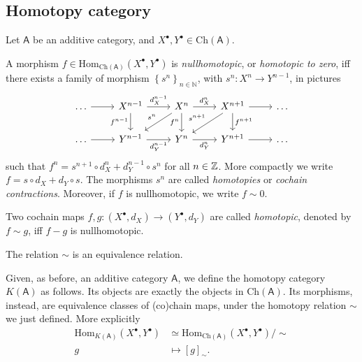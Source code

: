 \subsection{Homotopy category}
Let $\mathsf{A}$ be an additive category, and $X^{\bullet}, Y^{\bullet} \in \mathrm{Ch}(\mathsf{A})$.

\begin{defn}
	A morphism $f \in \mathrm{Hom}_{\mathrm{Ch}(\mathsf{A})} \left( X^{\bullet}, Y^{\bullet} \right)$ is
	{\em nullhomotopic}, or {\em homotopic to zero}, iff there exists
	a family of morphism $\left\{ s^n \right\}_{n \in \mathbb{N}}$, with
	$s^n\colon X^n \to Y^{n-1}$, in pictures
	\begin{equation}
	\begin{tikzcd}
		\ldots \arrow[r, "", rightarrow] &
		X^{n-1} \arrow[r, "d_X^{n-1}", rightarrow] \arrow[d, "f^{n-1}"', rightarrow] &
		X^n \arrow[r, "d^n_X", rightarrow] \arrow[d, "f^n"', rightarrow] \arrow[ld, "s^n"', rightarrow] &
		X^{n+1} \arrow[r, "", rightarrow] \arrow[d, "f^{n+1}", rightarrow] \arrow[dl, "s^{n+1}"', rightarrow] &
		\ldots \\
		\ldots \arrow[r, "", rightarrow] &
		Y^{n-1} \arrow[r, "d_Y^{n-1}"', rightarrow] &
		Y^n \arrow[r, "d^n_Y"', rightarrow] &
		Y^{n+1} \arrow[r, "", rightarrow] &
		\ldots
	\end{tikzcd}
	\end{equation}
	such that $f^n = s^{n+1} \circ d_X^{n} + d_Y^{n-1} \circ s^n$ for all $n \in \mathbb{Z}$.
	More compactly we write $f = s \circ d_X + d_Y \circ s$.
	The morphisms $s^n$ are called {\em homotopies} or {\em cochain contractions}.
	Moreover, if $f$ is nullhomotopic, we write $f \sim 0$.
\end{defn}

\begin{defn}
	Two cochain maps $f,g: \left( X^{\bullet}, d_{X} \right) \to \left( Y^{\bullet}, d_{Y} \right)$
	are called {\em homotopic}, denoted by $f \sim g$, iff
	$f - g$ is nullhomotopic.
\end{defn}

\begin{rem}[]
	The relation $\sim$ is an equivalence relation.
\end{rem}

\begin{defn}
	Given, as before, an additive category $\mathsf{A}$, we define the homotopy category
	$K(\mathsf{A})$ as follows.
	Its objects are exactly the objects in $\mathrm{Ch}(\mathsf{A})$.
	Its morphisms, instead, are equivalence classes of (co)chain maps,
	under the homotopy relation $\sim$ we just defined.
	More explicitly
	\begin{align}
		\mathrm{Hom}_{K(\mathsf{A})} \left( X^\bullet, Y^\bullet \right)
		&\simeq \mathrm{Hom}_{\mathrm{Ch}(\mathsf{A})}\left( X^\bullet, Y^\bullet \right)/\sim\\
		g &\mapsto \left[ g \right]_{\sim}
	.\end{align} 
\end{defn}

